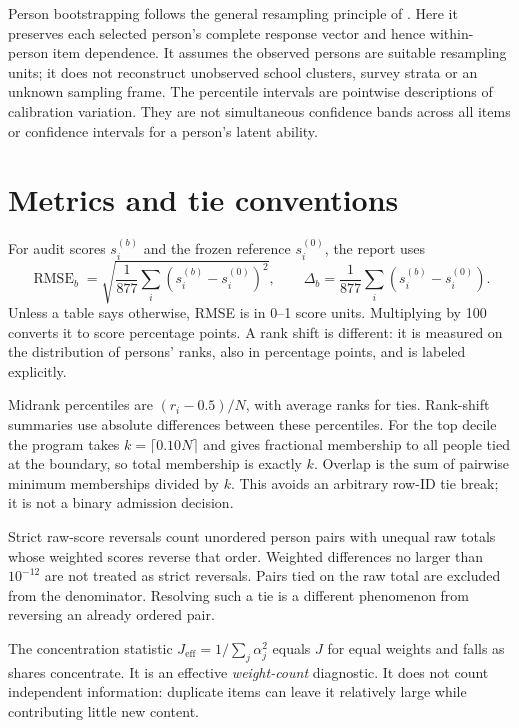 \documentclass[11pt,a4paper,oneside,headings=normal,parskip=half]{scrreprt}
\DeclareMathOperator{\RMSE}{RMSE}
\begin{document}
Person bootstrapping follows the general resampling principle of \citet{efron}. Here it preserves each selected person's complete response vector and hence within-person item dependence. It assumes the observed persons are suitable resampling units; it does not reconstruct unobserved school clusters, survey strata or an unknown sampling frame. The percentile intervals are pointwise descriptions of calibration variation. They are not simultaneous confidence bands across all items or confidence intervals for a person's latent ability.

\section{Metrics and tie conventions}
For audit scores $s_i^{(b)}$ and the frozen reference $s_i^{(0)}$, the report uses
\begin{equation}
\RMSE_b=\sqrt{\frac1{877}\sum_i(s_i^{(b)}-s_i^{(0)})^2},\qquad
\Delta_b=\frac1{877}\sum_i(s_i^{(b)}-s_i^{(0)}).
\end{equation}
Unless a table says otherwise, RMSE is in 0--1 score units. Multiplying by 100 converts it to score percentage points. A rank shift is different: it is measured on the distribution of persons' ranks, also in percentage points, and is labeled explicitly.

Midrank percentiles are $(r_i-0.5)/N$, with average ranks for ties. Rank-shift summaries use absolute differences between these percentiles. For the top decile the program takes $k=\lceil0.10N\rceil$ and gives fractional membership to all people tied at the boundary, so total membership is exactly $k$. Overlap is the sum of pairwise minimum memberships divided by $k$. This avoids an arbitrary row-ID tie break; it is not a binary admission decision.

Strict raw-score reversals count unordered person pairs with unequal raw totals whose weighted scores reverse that order. Weighted differences no larger than $10^{-12}$ are not treated as strict reversals. Pairs tied on the raw total are excluded from the denominator. Resolving such a tie is a different phenomenon from reversing an already ordered pair.

The concentration statistic $J_{\mathrm{eff}}=1/\sum_j\alpha_j^2$ equals $J$ for equal weights and falls as shares concentrate. It is an effective \emph{weight-count} diagnostic. It does not count independent information: duplicate items can leave it relatively large while contributing little new content.
\end{document}
